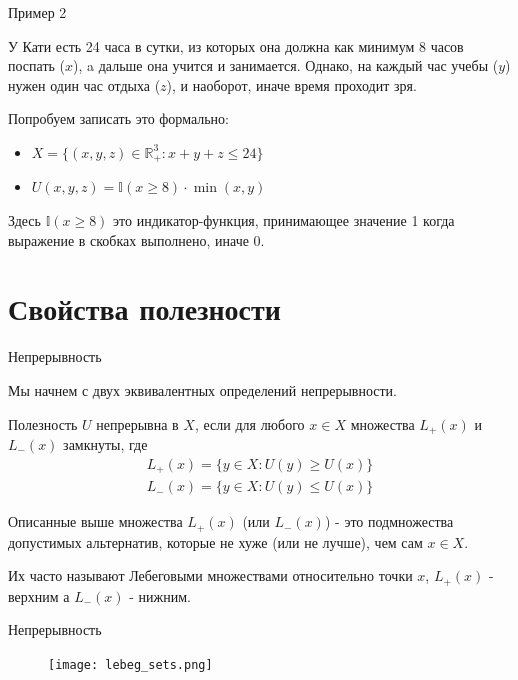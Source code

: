 \documentclass{beamer}
\begin{document}
\begin{frame}{Пример 2}

У Кати есть 24 часа в сутки, из которых она должна как минимум 8 часов поспать ($x$), a дальше она учится и занимается. Однако, на каждый час учебы ($y$) нужен один час отдыха ($z$), и наоборот, иначе время проходит зря.

Попробуем записать это формально:

\begin{itemize}
  \item $X = \{(x, y, z) \in  \mathbb{R}^3_{+}: x + y + z \leqslant 24 \}$
  \item $U(x, y, z) = \mathbb{I}(x \geqslant 8)\cdot \min(x,y)$
\end{itemize}

Здесь $\mathbb{I}(x \geqslant 8)$ это \alert{индикатор-функция}, принимающее значение 1 когда выражение в скобках выполнено, иначе 0.

\end{frame}

\section{Свойства полезности}

\begin{frame}{Непрерывность}

Мы начнем с двух эквивалентных определений непрерывности.

\begin{definition}
Полезность $U$ \alert{непрерывна} в $X$, если для любого $x \in X$ множества $L_{+}(x)$ и $L_{-}(x)$ замкнуты, где
\begin{gather*} L_{+}(x) = \{y \in X: U(y) \geqslant U(x)\}\\
 L_{-}(x) = \{y \in X: U(y) \leqslant U(x)\}\end{gather*}
\end{definition}

Описанные выше множества $L_{+}(x)$ (или $L_{-}(x)$) - это подмножества допустимых альтернатив, которые не хуже (или не лучше), чем сам $x \in X$. 

Их часто называют \alert{Лебеговыми множествами} относительно точки $x$, $L_{+}(x)$ - верхним а $L_{-}(x)$ - нижним.

\end{frame}

\begin{frame}{Непрерывность}

\begin{figure}[hbt]
\centering
\texttt{[image: lebeg\_sets.png]}
\end{figure}

\end{frame}
\end{document}
